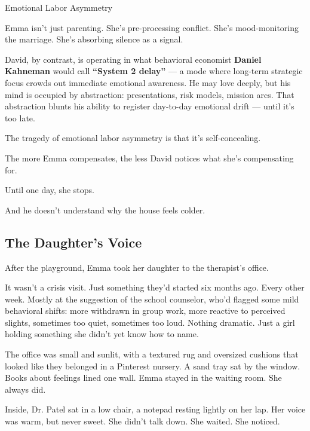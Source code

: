 \begin{PsychologicalSidebar}{Emotional Labor Asymmetry}
    \medskip
    
    Emma isn’t just parenting. She’s pre-processing conflict.  
    She’s mood-monitoring the marriage.  
    She’s absorbing silence as a signal.
    
    \medskip
    
    David, by contrast, is operating in what behavioral economist \textbf{Daniel Kahneman} would call 
    \textbf{“System 2 delay”} — a mode where long-term strategic focus crowds out immediate emotional 
    awareness. He may love deeply, but his mind is occupied by abstraction: presentations, risk models, 
    mission arcs. That abstraction blunts his ability to register day-to-day emotional drift — until 
    it's too late.
    
    \medskip
    
    The tragedy of emotional labor asymmetry is that it’s self-concealing.

    \medskip
    
    The more Emma compensates, the less David notices what she's compensating for.

    \medskip
    
    Until one day, she stops.

    \medskip
    
    And he doesn’t understand why the house feels colder.
    
\end{PsychologicalSidebar}
   

\subsection{The Daughter’s Voice}

After the playground, Emma took her daughter to the therapist’s office.

It wasn’t a crisis visit. Just something they’d started six months ago. Every other week. Mostly at the suggestion of the school counselor, who’d flagged some mild behavioral shifts: more withdrawn in group work, more reactive to perceived slights, sometimes too quiet, sometimes too loud. Nothing dramatic. Just a girl holding something she didn’t yet know how to name.

The office was small and sunlit, with a textured rug and oversized cushions that looked like they belonged in a Pinterest nursery. A sand tray sat by the window. Books about feelings lined one wall. Emma stayed in the waiting room. She always did.

Inside, Dr. Patel sat in a low chair, a notepad resting lightly on her lap. Her voice was warm, but never sweet. She didn’t talk down. She waited. She noticed.

